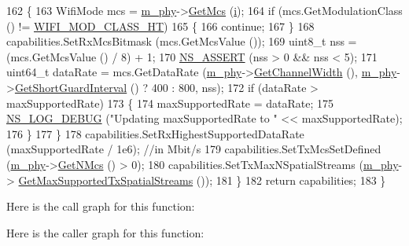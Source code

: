 \begin{DoxyCode}
162         \{
163           WifiMode mcs = \hyperlink{classns3_1_1RegularWifiMac_a1a6dad8eb0a057a4e1b459f518457a4c}{m\_phy}->\hyperlink{classns3_1_1WifiPhy_a6a8740a6fbb7ff618c80e0a0867467fd}{GetMcs} (\hyperlink{bernuolliDistribution_8m_a6f6ccfcf58b31cb6412107d9d5281426}{i});
164           \textcolor{keywordflow}{if} (mcs.GetModulationClass () != \hyperlink{namespacens3_aa999e1221606a2b21b1eb33c2007c217a6ac45cac36cc4454649435d24ebf349c}{WIFI\_MOD\_CLASS\_HT})
165             \{
166               \textcolor{keywordflow}{continue};
167             \}
168           capabilities.SetRxMcsBitmask (mcs.GetMcsValue ());
169           uint8\_t nss = (mcs.GetMcsValue () / 8) + 1;
170           \hyperlink{assert_8h_a6dccdb0de9b252f60088ce281c49d052}{NS\_ASSERT} (nss > 0 && nss < 5);
171           uint64\_t dataRate = mcs.GetDataRate (\hyperlink{classns3_1_1RegularWifiMac_a1a6dad8eb0a057a4e1b459f518457a4c}{m\_phy}->\hyperlink{classns3_1_1WifiPhy_a4a5d5009b3b3308f2baeed42a2007189}{GetChannelWidth} (), 
      \hyperlink{classns3_1_1RegularWifiMac_a1a6dad8eb0a057a4e1b459f518457a4c}{m\_phy}->\hyperlink{classns3_1_1WifiPhy_ae907e448ace9df4d647c8f97bbec23fc}{GetShortGuardInterval} () ? 400 : 800, nss);
172           \textcolor{keywordflow}{if} (dataRate > maxSupportedRate)
173             \{
174               maxSupportedRate = dataRate;
175               \hyperlink{group__logging_ga413f1886406d49f59a6a0a89b77b4d0a}{NS\_LOG\_DEBUG} (\textcolor{stringliteral}{"Updating maxSupportedRate to "} << maxSupportedRate);
176             \}
177         \}
178       capabilities.SetRxHighestSupportedDataRate (maxSupportedRate / 1e6); \textcolor{comment}{//in Mbit/s}
179       capabilities.SetTxMcsSetDefined (\hyperlink{classns3_1_1RegularWifiMac_a1a6dad8eb0a057a4e1b459f518457a4c}{m\_phy}->\hyperlink{classns3_1_1WifiPhy_aede1b3de380510e387aaafcfda7a0db0}{GetNMcs} () > 0);
180       capabilities.SetTxMaxNSpatialStreams (\hyperlink{classns3_1_1RegularWifiMac_a1a6dad8eb0a057a4e1b459f518457a4c}{m\_phy}->
      \hyperlink{classns3_1_1WifiPhy_ab5e6bb95a75d0e6e7e666efd3c014fe4}{GetMaxSupportedTxSpatialStreams} ());
181     \}
182   \textcolor{keywordflow}{return} capabilities;
183 \}
\end{DoxyCode}


Here is the call graph for this function\+:




Here is the caller graph for this function\+:


